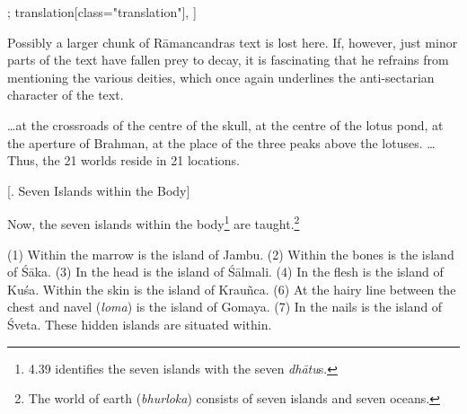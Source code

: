 \begin{alignment}[
  texts=edition[class="edition"];
  translation[class="translation"],
  ]
\begin{translation}
\begin{tlate}
{\begin{quote}
\end{quote}
Possibly a larger chunk of Rāmancandras text is lost here. If, however, just minor parts of the text have fallen prey to decay, it is fascinating that he refrains from mentioning the various deities, which once again underlines the anti-sectarian character of the text.}
\sic*{}  \ldots at the crossroads of the centre of the skull, at the centre of the lotus pond, at the aperture of Brahman, at the place of the three peaks above the lotuses. \ldots \sic*{} Thus, the 21 worlds reside in 21 locations.
\end{tlate}
\begin{tlate}
  \bigskip
  \centerline{\textrm{\small{[. Seven Islands within the Body]}}}
  \bigskip
\noindent
Now, the seven islands within the body\footnote{ 4.39 identifies the seven islands with the seven \textit{dhātu}s.} are taught.\footnote{The world of earth (\textit{bhurloka}) consists of seven islands and seven oceans.} 

(1) Within the marrow is the island of Jambu. (2) Within the bones is the island of Śāka. (3) In the head is the island of Śālmali. (4) In the flesh is the island of Kuśa. Within the skin is the island of Krauñca. (6) At the hairy line between the chest and navel (\textit{loma}) is the island of Gomaya. (7) In the nails is the island of Śveta. These hidden islands are situated within.
\end{tlate}
  \end{translation}
\end{alignment}
\pagebreak %
